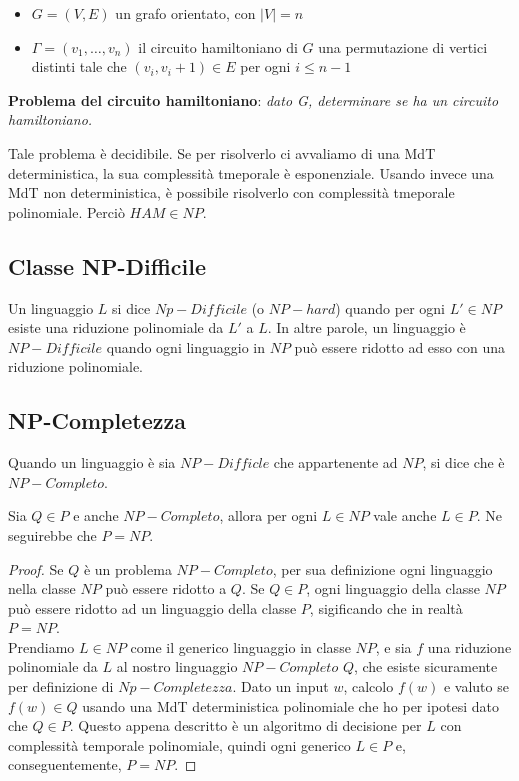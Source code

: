 \begin{itemize}
	\item $G = (V, E)$ un grafo orientato, con $|V| = n$
	\item $\Gamma = (v_1, \ldots, v_n)$ il circuito hamiltoniano di $G$
		\subitem una permutazione di vertici distinti tale che $(v_i, v_i+1) \in E$ per ogni $i \leq n-1$
\end{itemize}

\textbf{Problema del circuito hamiltoniano}: \textit{dato G, determinare se ha un circuito hamiltoniano.}

Tale problema è decidibile. Se per risolverlo ci avvaliamo di una MdT deterministica, la sua complessità tmeporale è esponenziale. Usando invece una MdT non deterministica, è possibile risolverlo con complessità tmeporale polinomiale. Perciò $HAM \in NP$.

\subsection{Classe NP-Difficile}

\begin{defn}
	Un linguaggio $L$ si dice $Np-Difficile$ (o $NP-hard$) quando per ogni $L' \in NP$ esiste una riduzione polinomiale da $L'$ a $L$. In altre parole, un linguaggio è $NP-Difficile$ quando ogni linguaggio in $NP$ può essere ridotto ad esso con una riduzione polinomiale.
\end{defn}

\subsection{NP-Completezza}

\begin{defn}	
	Quando un linguaggio è sia $NP-Difficle$ che appartenente ad $NP$, si dice che è $NP-Completo$.
\end{defn}

\vspace{0.2cm}

\begin{lemm}
	Sia $Q \in P$ e anche $NP-Completo$, allora per ogni $L \in NP$ vale anche $L \in P$. Ne seguirebbe che $P = NP$.
\end{lemm}

\begin{proof}
	Se $Q$ è un problema $NP-Completo$, per sua definizione ogni linguaggio nella classe $NP$ può essere ridotto a $Q$. Se $Q \in P$, ogni linguaggio della classe $NP$ può essere ridotto ad un linguaggio della classe $P$, sigificando che in realtà $P = NP$. \\ Prendiamo $L \in NP$ come il generico linguaggio in classe $NP$, e sia $f$ una riduzione polinomiale da $L$ al nostro linguaggio $NP-Completo$ $Q$, che esiste sicuramente per definizione di $Np-Completezza$. Dato un input $w$, calcolo $f(w)$ e valuto se $f(w) \in Q$ usando una MdT deterministica polinomiale che ho per ipotesi dato che $Q \in P$. Questo appena descritto è un algoritmo di decisione per $L$ con complessità temporale polinomiale, quindi ogni generico $L \in P$ e, conseguentemente, $P = NP$.

\end{proof}
